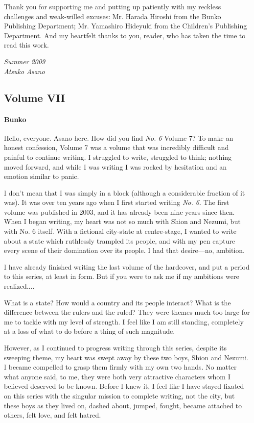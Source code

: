 Thank you for supporting me and putting up patiently with my reckless
challenges and weak-willed excuses: Mr. Harada Hiroshi from the Bunko
Publishing Department; Mr. Yamashiro Hideyuki from the Children's
Publishing Department. And my heartfelt thanks to you, reader, who has
taken the time to read this work.

\myspace

\emph{Summer 2009\\
	Atsuko Asano}

\subsection{Volume VII}
\paragraph{Bunko}

Hello, everyone. Asano here. How did you find \emph{No. 6} Volume 7? To make an honest confession, Volume 7 was a volume that was incredibly difficult and painful to continue writing. I struggled to write, struggled to think; nothing moved forward, and while I was writing I was rocked by hesitation and an emotion similar to panic.

I don't mean that I was simply in a block (although a considerable fraction of it was). It was over ten years ago when I first started writing \emph{No. 6}. The first volume was published in 2003, and it has already been nine years since then. When I began writing, my heart was not so much with Shion and Nezumi, but with No. 6 itself. With a fictional city-state at centre-stage, I wanted to write about a state which ruthlessly trampled its people, and with my pen capture every scene of their domination over its people. I had that desire---no, ambition.

I have already finished writing the last volume of the hardcover, and put a period to this series, at least in form. But if you were to ask me if my ambitions were realized....

What is a state? How would a country and its people interact? What is the difference between the rulers and the ruled? They were themes much too large for me to tackle with my level of strength. I feel like I am still standing, completely at a loss of what to do before a thing of such magnitude.

However, as I continued to progress writing through this series, despite its sweeping theme, my heart was swept away by these two boys, Shion and Nezumi. I became compelled to grasp them firmly with my own two hands. No matter what anyone said, to me, they were both very attractive characters whom I believed deserved to be known. Before I knew it, I feel like I have stayed fixated on this series with the singular mission to complete writing, not the city, but these boys as they lived on, dashed about, jumped, fought, became attached to others, felt love, and felt hatred.

